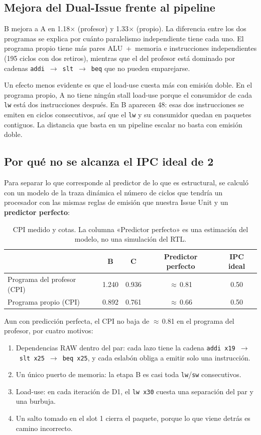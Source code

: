 \documentclass[11pt,a4paper]{article}
\newcommand{\sig}[1]{\texttt{#1}}
\begin{document}
\subsection{Mejora del Dual-Issue frente al pipeline}

B mejora a A en 1.18$\times$ (profesor) y 1.33$\times$ (propio). La diferencia entre los dos programas se explica por cuánto paralelismo independiente tiene cada uno. El programa propio tiene más pares ALU~+~memoria e instrucciones independientes (195 ciclos con dos retiros), mientras que el del profesor está dominado por cadenas \sig{addi}~$\rightarrow$~\sig{slt}~$\rightarrow$~\sig{beq} que no pueden emparejarse.

Un efecto menos evidente es que el load-use cuesta más con emisión doble. En el programa propio, A no tiene ningún stall load-use porque el consumidor de cada \sig{lw} está dos instrucciones después. En B aparecen 48: esas dos instrucciones se emiten en ciclos consecutivos, así que el \sig{lw} y su consumidor quedan en paquetes contiguos. La distancia que basta en un pipeline escalar no basta con emisión doble.

\subsection{Por qué no se alcanza el IPC ideal de 2}

Para separar lo que corresponde al predictor de lo que es estructural, se calculó con un modelo de la traza dinámica el número de ciclos que tendría un procesador con las mismas reglas de emisión que nuestra Issue Unit y un \textbf{predictor perfecto}:

\begin{table}[H]
\centering
\begin{tabular}{lcccc}
\toprule
 & B & C & Predictor perfecto & IPC ideal \\
\midrule
Programa del profesor (CPI) & 1.240 & 0.936 & $\approx$\,0.81 & 0.50 \\
Programa propio (CPI) & 0.892 & 0.761 & $\approx$\,0.66 & 0.50 \\
\bottomrule
\end{tabular}
\caption{CPI medido y cotas. La columna «Predictor perfecto» es una estimación del modelo, no una simulación del RTL.}
\end{table}

Aun con predicción perfecta, el CPI no baja de $\approx$\,0.81 en el programa del profesor, por cuatro motivos:
\begin{enumerate}[nosep]
  \item Dependencias RAW dentro del par: cada lazo tiene la cadena \sig{addi x19}~$\rightarrow$~\sig{slt x25}~$\rightarrow$~\sig{beq x25}, y cada eslabón obliga a emitir solo una instrucción.
  \item Un único puerto de memoria: la etapa B es casi toda \sig{lw}/\sig{sw} consecutivos.
  \item Load-use: en cada iteración de D1, el \sig{lw x30} cuesta una separación del par y una burbuja.
  \item Un salto tomado en el slot 1 cierra el paquete, porque lo que viene detrás es camino incorrecto.
\end{enumerate}
\end{document}
